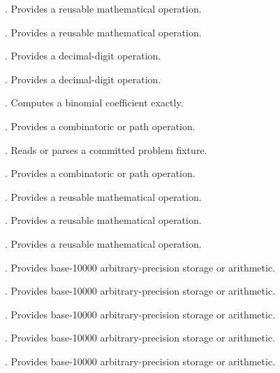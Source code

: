 \begin{description}
\item[\texttt{}] \texttt{}. Provides a reusable mathematical operation.
\item[\texttt{}] \texttt{}. Provides a reusable mathematical operation.
\item[\texttt{}] \texttt{}. Provides a decimal-digit operation.
\item[\texttt{}] \texttt{}. Provides a decimal-digit operation.
\item[\texttt{}] \texttt{}. Computes a binomial coefficient exactly.
\item[\texttt{}] \texttt{}. Provides a combinatoric or path operation.
\item[\texttt{}] \texttt{}. Reads or parses a committed problem fixture.
\item[\texttt{}] \texttt{}. Provides a combinatoric or path operation.
\item[\texttt{}] \texttt{}. Provides a reusable mathematical operation.
\item[\texttt{}] \texttt{}. Provides a reusable mathematical operation.
\item[\texttt{}] \texttt{}. Provides a reusable mathematical operation.
\item[\texttt{}] \texttt{}. Provides base-10000 arbitrary-precision storage or arithmetic.
\item[\texttt{}] \texttt{}. Provides base-10000 arbitrary-precision storage or arithmetic.
\item[\texttt{}] \texttt{}. Provides base-10000 arbitrary-precision storage or arithmetic.
\item[\texttt{}] \texttt{}. Provides base-10000 arbitrary-precision storage or arithmetic.
\item[\texttt{}] \texttt{}. Provides base-10000 arbitrary-precision storage or arithmetic.

\end{description}
